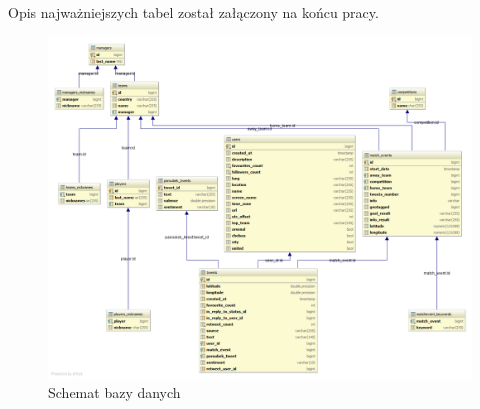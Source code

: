 Opis najważniejszych tabel został załączony na końcu pracy.

\begin{figure}[ht!]
\centering
\includegraphics[width=160mm]{img/db-schema-intellij.png}
\caption{Schemat bazy danych}
\label{image:schemat-bazy}
\end{figure}